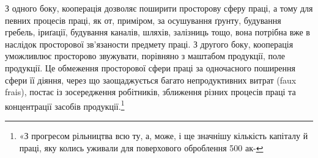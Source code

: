 З одного боку, кооперація дозволяє поширити просторову
сферу праці, а тому для певних процесів праці, як от, приміром,
за осушування ґрунту, будування гребель, іриґації, будування
каналів, шляхів, залізниць тощо, вона потрібна вже в наслідок
просторової зв’язаности предмету праці. З другого боку, кооперація
уможливлює просторово звужувати, порівняно з маштабом
продукції, поле продукції. Це обмеження просторової сфери праці
за одночасного поширення сфери її діяння, через що заощаджується
багато непродуктивних витрат (faux frais), постає із зосередження
робітників, зближення різних процесів праці та концентрації
засобів продукції.\footnote{
«З прогресом рільництва всю ту, а, може, і ще значнішу кількість
капіталу й праці, яку колись уживали для поверхового оброблення 500 ак-
}
